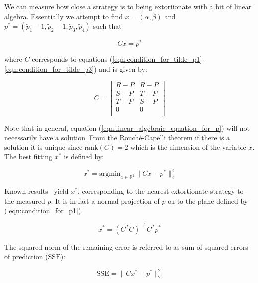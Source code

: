 \documentclass[a4paper]{article}
\newcommand{\SSe}{\text{SSE}}
\begin{document}
We can measure how close a strategy is to being extortionate with a bit of
linear algebra. Essentially we attempt to find \(x=(\alpha, \beta)\) and
\(p^*=(\tilde p_1 - 1, \tilde p_2 - 1, \tilde p_3, \tilde p_4)\) such that

\begin{equation}\label{eqn:linear_algebraic_equation_for_p}
    Cx= p^*
\end{equation}

where \(C\) corresponds to equations
(\ref{eqn:condition_for_tilde_p1}-\ref{eqn:condition_for_tilde_p3}) and is
given by:

\begin{equation}\label{eqn:definition_of_C}
    C =
    \begin{bmatrix}
        R - P & R- P \\
        S - P & T- P \\
        T - P & S- P \\
        0     & 0 \\
    \end{bmatrix}
\end{equation}

Note that in general, equation (\ref{eqn:linear_algebraic_equation_for_p}) will
not necessarily have a solution. From the Rouch\'{e}-Capelli theorem if there is
a solution it is unique since \(\text{rank}(C)=2\) which is the dimension of the
variable \(x\). The best fitting \(x^*\) is defined by:

\begin{equation}\label{eqn:x_star}
    x^* = \text{argmin}_{x\in\mathbb{R}^2}\|C x- p^*\|_2^2
\end{equation}

Known results~\cite{kutner2004applied, rao1973linear, wakefield2013bayesian} yield
$x^*$, corresponding to the nearest extortionate strategy to the
measured \(p\). It is in fact a normal projection of \(p\) on to the plane
defined by (\ref{eqn:condition_for_p1}).

\begin{equation}\label{eqn:x_star_formula}
    x^* = {\left(C^{T}C\right)}^{-1}C^{T}p^{*}
\end{equation}

The squared norm of the remaining error is referred to as sum of squared errors
of prediction (\(\SSe\)):

\begin{equation}\label{eqn:r_squared}
    \SSe = \|C x^*- p^*\|_2^2
\end{equation}
\end{document}
